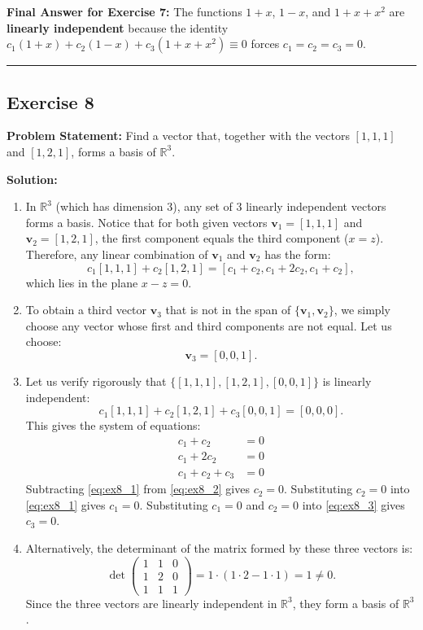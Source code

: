 \documentclass[11pt,a4paper]{article}
\begin{document}
\textbf{Final Answer for Exercise 7:} The functions $1 + x$, $1 - x$, and $1 + x + x^2$ are \textbf{linearly independent} because the identity $c_1(1 + x) + c_2(1 - x) + c_3(1 + x + x^2) \equiv 0$ forces $c_1 = c_2 = c_3 = 0$.

\bigskip
\hrule
\bigskip

\subsection*{Exercise 8}
\textbf{Problem Statement:} Find a vector that, together with the vectors $[1, 1, 1]$ and $[1, 2, 1]$, forms a basis of $\mathbb{R}^3$.

\textbf{Solution:}
\begin{enumerate}
    \item In $\mathbb{R}^3$ (which has dimension $3$), any set of $3$ linearly independent vectors forms a basis. Notice that for both given vectors $\mathbf{v}_1 = [1, 1, 1]$ and $\mathbf{v}_2 = [1, 2, 1]$, the first component equals the third component ($x = z$). Therefore, any linear combination of $\mathbf{v}_1$ and $\mathbf{v}_2$ has the form:
    \[
        c_1[1, 1, 1] + c_2[1, 2, 1] = [c_1 + c_2, c_1 + 2c_2, c_1 + c_2],
    \]
    which lies in the plane $x - z = 0$.
    \item To obtain a third vector $\mathbf{v}_3$ that is not in the span of $\{\mathbf{v}_1, \mathbf{v}_2\}$, we simply choose any vector whose first and third components are not equal. Let us choose:
    \[
        \mathbf{v}_3 = [0, 0, 1].
    \]
    \item Let us verify rigorously that $\{[1, 1, 1], [1, 2, 1], [0, 0, 1]\}$ is linearly independent:
    \[
        c_1[1, 1, 1] + c_2[1, 2, 1] + c_3[0, 0, 1] = [0, 0, 0].
    \]
    This gives the system of equations:
    \begin{align}
        c_1 + c_2 &= 0 \label{eq:ex8_1} \\
        c_1 + 2c_2 &= 0 \label{eq:ex8_2} \\
        c_1 + c_2 + c_3 &= 0 \label{eq:ex8_3}
    \end{align}
    Subtracting \eqref{eq:ex8_1} from \eqref{eq:ex8_2} gives $c_2 = 0$. Substituting $c_2 = 0$ into \eqref{eq:ex8_1} gives $c_1 = 0$. Substituting $c_1 = 0$ and $c_2 = 0$ into \eqref{eq:ex8_3} gives $c_3 = 0$.
    \item Alternatively, the determinant of the matrix formed by these three vectors is:
    \[
        \det \begin{pmatrix} 1 & 1 & 0 \\ 1 & 2 & 0 \\ 1 & 1 & 1 \end{pmatrix} = 1 \cdot (1 \cdot 2 - 1 \cdot 1) = 1 \neq 0.
    \]
    Since the three vectors are linearly independent in $\mathbb{R}^3$, they form a basis of $\mathbb{R}^3$.
\end{enumerate}
\end{document}
